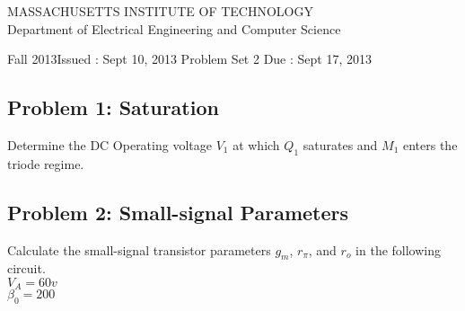 \documentclass[11pt,twoside]{article}
\newlength{\toppush}
\newcommand{\htitle}[3]{\begin{center}
\vspace*{-\toppush}
{\large MASSACHUSETTS INSTITUTE OF TECHNOLOGY}\\
{\small Department of Electrical Engineering and Computer Science}\\
\vspace*{1ex}{\Large #2}\end{center}
\noindent
\newline\parbox{6.5in}
{Fall 2013\hfill Issued : #1 \newline
 Problem Set 2 \hfill Due : #3\newline
}}
\newcommand{\handout}[3]{\thispagestyle{empty}
\pagestyle{myheadings}\htitle{#1}{#2}{#3}}
\begin{document}
\handout{Sept 10, 2013}{6.301 Solid State Circuits}{Sept 17, 2013}
\setlength{\parindent}{0pt}

\newcommand{\solution}{
 \medskip
 {\bf Solution:}
}

\hrulefill

\flushleft
\subsection*{Problem 1: Saturation}
Determine the DC Operating voltage $V_1$ at which $Q_1$ saturates and $M_1$ enters the triode regime.

\begin{center}
\end{center}

\subsection*{Problem 2: Small-signal Parameters}
Calculate the small-signal transistor parameters $g_m$, $r_{\pi}$, and $r_o$ in the following circuit. \\
$V_A = 60v$ \\
$\beta_0 = 200$ \\

\clearpage
\end{document}
